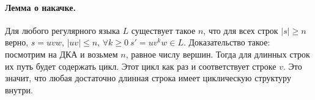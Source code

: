 \documentclass[12pt]{article}
\begin{document}
\paragraph{Лемма о накачке.} Для любого регулярного языка $L$ существует такое $n$, что для всех строк $|s| \ge n$ верно, $s = uvw$, $|uv| \le n$, $\forall k \ge 0\ s'=uv^kw \in L$. Доказательство такое: посмотрим на ДКА и возьмем $n$, равное числу вершин. Тогда для длинных строк их путь будет содержать цикл. Этот цикл как раз и соответствует строке $v$. Это значит, что любая достаточно длинная строка имеет циклическую структуру внутри.
\end{document}

